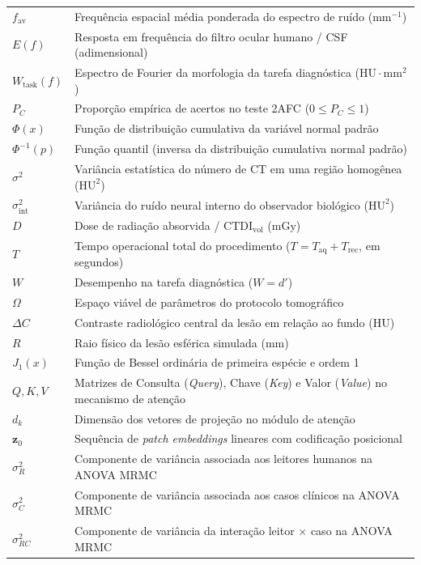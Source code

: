 \documentclass[
  12pt,
  a4paper,
  oneside
]{report}
\begin{document}
\begin{longtable}{ll}
$f_{\text{av}}$ & Frequência espacial média ponderada do espectro de ruído ($\text{mm}^{-1}$) \\
$E(f)$ & Resposta em frequência do filtro ocular humano / CSF (adimensional) \\
$W_{\text{task}}(f)$ & Espectro de Fourier da morfologia da tarefa diagnóstica ($\text{HU}\cdot\text{mm}^2$) \\
$P_C$ & Proporção empírica de acertos no teste 2AFC ($0 \le P_C \le 1$) \\
$\Phi(x)$ & Função de distribuição cumulativa da variável normal padrão \\
$\Phi^{-1}(p)$ & Função quantil (inversa da distribuição cumulativa normal padrão) \\
$\sigma^2$ & Variância estatística do número de CT em uma região homogênea ($\text{HU}^2$) \\
$\sigma_{\text{int}}^2$ & Variância do ruído neural interno do observador biológico ($\text{HU}^2$) \\
$D$ & Dose de radiação absorvida / $\text{CTDI}_{\text{vol}}$ ($\text{mGy}$) \\
$T$ & Tempo operacional total do procedimento ($T = T_{\text{aq}} + T_{\text{rec}}$, em segundos) \\
$W$ & Desempenho na tarefa diagnóstica ($W = d'$) \\
$\Omega$ & Espaço viável de parâmetros do protocolo tomográfico \\
$\Delta C$ & Contraste radiológico central da lesão em relação ao fundo ($\text{HU}$) \\
$R$ & Raio físico da lesão esférica simulada ($\text{mm}$) \\
$J_1(x)$ & Função de Bessel ordinária de primeira espécie e ordem 1 \\
$Q, K, V$ & Matrizes de Consulta (\emph{Query}), Chave (\emph{Key}) e Valor (\emph{Value}) no mecanismo de atenção \\
$d_k$ & Dimensão dos vetores de projeção no módulo de atenção \\
$\mathbf{z}_0$ & Sequência de \emph{patch embeddings} lineares com codificação posicional \\
$\sigma^2_R$ & Componente de variância associada aos leitores humanos na ANOVA MRMC \\
$\sigma^2_C$ & Componente de variância associada aos casos clínicos na ANOVA MRMC \\
$\sigma^2_{RC}$ & Componente de variância da interação leitor $\times$ caso na ANOVA MRMC \\
\bottomrule
\end{longtable}
\clearpage
\end{document}
